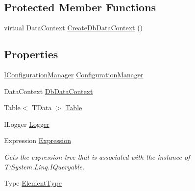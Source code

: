 \subsection*{Protected Member Functions}
\begin{DoxyCompactItemize}
\item 
virtual Data\+Context \hyperlink{classCqrs_1_1DataStores_1_1SqlDataStore_a8458af970314deef8eff6a4783b1c46f}{Create\+Db\+Data\+Context} ()
\end{DoxyCompactItemize}
\subsection*{Properties}
\begin{DoxyCompactItemize}
\item 
\hyperlink{interfaceCqrs_1_1Configuration_1_1IConfigurationManager}{I\+Configuration\+Manager} \hyperlink{classCqrs_1_1DataStores_1_1SqlDataStore_a9d720406a3c3abbd8bf1924bd81874ac}{Configuration\+Manager}
\item 
Data\+Context \hyperlink{classCqrs_1_1DataStores_1_1SqlDataStore_aa944d65b800ad9ba7809e96ed2b86f26}{Db\+Data\+Context}
\item 
Table$<$ T\+Data $>$ \hyperlink{classCqrs_1_1DataStores_1_1SqlDataStore_abcd0a88f984a275880f402baadaae2c7}{Table}
\item 
I\+Logger \hyperlink{classCqrs_1_1DataStores_1_1SqlDataStore_a44cd63b587e42b278177070eab8404f7}{Logger}
\item 
Expression \hyperlink{classCqrs_1_1DataStores_1_1SqlDataStore_a1fb28f14cf7762331ec9e7d5efe19c75}{Expression}
\begin{DoxyCompactList}\small\item\em Gets the expression tree that is associated with the instance of T\+:\+System.\+Linq.\+I\+Queryable. \end{DoxyCompactList}\item 
Type \hyperlink{classCqrs_1_1DataStores_1_1SqlDataStore_ab96bad4f637c7cfc95e97598c8753d02}{Element\+Type}

\end{DoxyCompactItemize}
